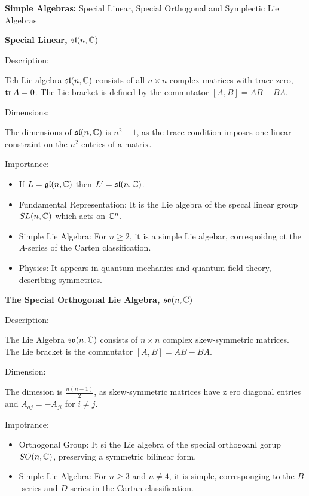 \documentclass[12pt,a4paper]{report}
\begin{document}
\HLINE
\newcommand{\SLC}{\mathfrak{sl}(n,\C)}
\newcommand{\SOC}{\mathfrak{so}(n,\C)}
\newcommand{\SPC}{\mathfrak{sp}(2n,\C)}
\begin{remark}{\textbf{Simple Algebras:} Special Linear, Special Orthogonal and Symplectic Lie Algebras}
\begin{description}
	\item \textbf{Special Linear, $\mathfrak{sl}(n,\mathbb{C})$}
	
	Description:
	
	Teh Lie algebra $\SLC$ consists of all $n \times n$ complex matrices with trace zero, $\operatorname{tr} A = 0$.  The Lie bracket is defined by the commutator $[A,B]=AB-BA$.
	
	Dimensions:
	
	The dimensions of $\SLC$ is $n^2-1$, as the trace condition imposes one linear constraint on the $n^2$ entries of a matrix.
	
	Importance:
	\begin{itemize}
		\item If $L = \mathfrak{gl}(n,\mathbb{C})$ then $L'= \SLC$.
		\item Fundamental Representation: It is the Lie algebra of the specal linear group $SL(n,\mathbb{C})$ which acts on $\mathbb{C}^n$.
		\item Simple Lie Algebra: For $n \ge 2$, it is a simple Lie algebar, correspoidng ot the $A$-series of the Carten classification.
		\item Physics: It appears in quantum mechanics and quantum field theory,  describing symmetries.
	\end{itemize}
	
	\item \textbf{The Special Orthogonal Lie Algebra, $\SOC$}
	
	Description:
	
	The Lie Algebra $\SOC$ consists of $n \times n$ complex skew-symmetric matrices.  The Lie bracket is the commutator $[A,B]=AB-BA$.
	
	Dimension:
	
	The dimesion is $\frac{n(n-1)}{2}$, as skew-symmetric matrices have z ero diagonal entries and $A_{aj}=-A_{ji}$ for $i \ne j$.
	
	Impotrance:
	
	\begin{itemize}
		\item Orthogonal Group:  It si the Lie algebra of the special orthogoanl gorup $SO(n,\mathbb{C})$, preserving a symmetric bilinear form.
		
		\item Simple Lie Algebra: For $n\ge 3$ and $n \ne 4$, it is simple, corresponging to the $B$-series  and $D$-series in the Cartan classification.
		

\end{itemize}
\end{description}
\end{remark}
\end{document}
